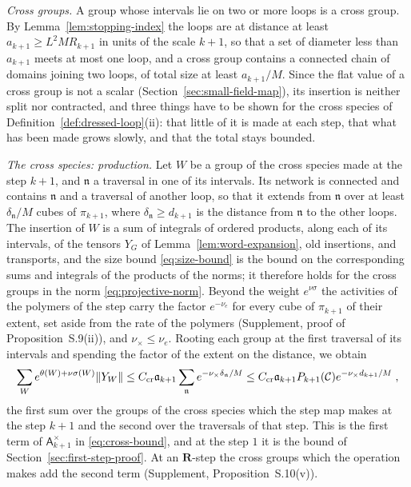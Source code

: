 \documentclass[11pt]{preprint}
\DeclarePairedDelimiter{\norm}{\lVert}{\rVert}
\numberwithin{equation}{section}
\theoremstyle{definition}
\theoremstyle{remark}
\theoremstyle{plain}
\begin{document}
\emph{Cross groups.} A group whose intervals lie on two or more loops is a cross group. By Lemma~\ref{lem:stopping-index} the loops are at distance at least $a_{k+1} \geq L^2MR_{k+1}$ in units of the scale $k + 1$, so that a set of diameter less than $a_{k+1}$ meets at most one loop, and a cross group contains a connected chain of domains joining two loops, of total size at least $a_{k+1}/M$. Since the flat value of a cross group is not a scalar (Section~\ref{sec:small-field-map}), its insertion is neither split nor contracted, and three things have to be shown for the cross species of Definition~\ref{def:dressed-loop}(ii): that little of it is made at each step, that what has been made grows slowly, and that the total stays bounded.

\emph{The cross species: production.} Let $W$ be a group of the cross species made at the step $k + 1$, and $\mathfrak n$ a traversal in one of its intervals. Its network is connected and contains $\mathfrak n$ and a traversal of another loop, so that it extends from $\mathfrak n$ over at least $\delta_{\mathfrak n}/M$ cubes of $\pi_{k+1}$, where $\delta_{\mathfrak n} \geq d_{k+1}$ is the distance from $\mathfrak n$ to the other loops. The insertion of $W$ is a sum of integrals of ordered products, along each of its intervals, of the tensors $Y_G$ of Lemma~\ref{lem:word-expansion}, old insertions, and transports, and the size bound \eqref{eq:size-bound} is the bound on the corresponding sums and integrals of the products of the norms; it therefore holds for the cross groups in the norm \eqref{eq:projective-norm}. Beyond the weight $e^{\nu\sigma}$ the activities of the polymers of the step carry the factor $e^{-\nu_e}$ for every cube of $\pi_{k+1}$ of their extent, set aside from the rate of the polymers (Supplement, proof of Proposition~S.9(ii)), and $\nu_\times \leq \nu_e$. Rooting each group at the first traversal of its intervals and spending the factor of the extent on the distance, we obtain
\begin{equation}\label{eq:cross-production}
    \sum_We^{\theta(W) + \nu\sigma(W)}\norm{Y_W} \leq C_{\mathrm{cr}}\mathfrak a_{k+1}\sum_{\mathfrak n}e^{-\nu_\times\delta_{\mathfrak n}/M} \leq C_{\mathrm{cr}}\mathfrak a_{k+1}P_{k+1}(\mathcal C)e^{-\nu_\times d_{k+1}/M}\;,
\end{equation}
the first sum over the groups of the cross species which the step map makes at the step $k + 1$ and the second over the traversals of that step. This is the first term of $\mathsf A^\times_{k+1}$ in \eqref{eq:cross-bound}, and at the step $1$ it is the bound of Section~\ref{sec:first-step-proof}. At an $\mathbf R$-step the cross groups which the operation makes add the second term (Supplement, Proposition~S.10(v)).
\end{document}
